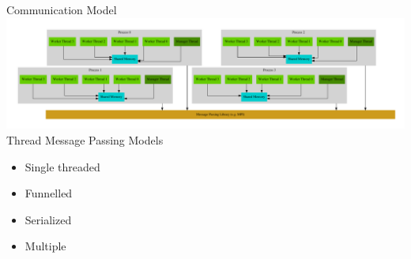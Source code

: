 \documentclass[10pt]{beamer}
\begin{document}
\begin{frame}{Communication Model}
    \includegraphics[width=\textwidth]{../figs/graphviz/warped_communication.pdf} \\
    Thread Message Passing Models
    \begin{itemize}
        \item Single threaded
        \item Funnelled
        \item Serialized
        \item Multiple
    \end{itemize}
\end{frame}
\end{document}
